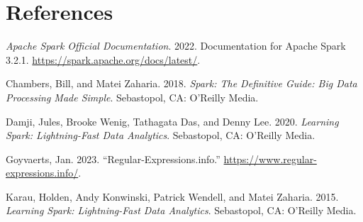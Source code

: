 \documentclass[
  11pt,
  letterpaper,
  DIV=11,
  numbers=noendperiod]{scrreprt}
\newlength{\cslhangindent}
\newlength{\cslentryspacingunit} %
\newenvironment{CSLReferences}[2] %
 {%
  \setlength{\parindent}{0pt}
  \ifodd #1
  \let\oldpar\par
  \def\par{\hangindent=\cslhangindent\oldpar}
  \fi
  \setlength{\parskip}{#2\cslentryspacingunit}
 }%
 {}
\begin{document}

\hypertarget{references}{%
\chapter*{References}\label{references}}


\hypertarget{refs}{}
\begin{CSLReferences}{1}{0}
\leavevmode{}%
\emph{Apache Spark Official Documentation}. 2022. Documentation for
Apache Spark 3.2.1. \url{https://spark.apache.org/docs/latest/}.

\leavevmode{}%
Chambers, Bill, and Matei Zaharia. 2018. \emph{Spark: The Definitive
Guide: Big Data Processing Made Simple}. Sebastopol, CA: O'Reilly Media.

\leavevmode{}%
Damji, Jules, Brooke Wenig, Tathagata Das, and Denny Lee. 2020.
\emph{Learning Spark: Lightning-Fast Data Analytics}. Sebastopol, CA:
O'Reilly Media.

\leavevmode{}%
Goyvaerts, Jan. 2023. {``Regular-Expressions.info.''}
\url{https://www.regular-expressions.info/}.

\leavevmode{}%
Karau, Holden, Andy Konwinski, Patrick Wendell, and Matei Zaharia. 2015.
\emph{Learning Spark: Lightning-Fast Data Analytics}. Sebastopol, CA:
O'Reilly Media.

\end{CSLReferences}
\end{document}
